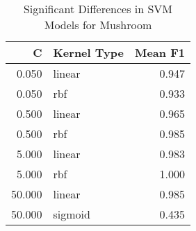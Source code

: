 \begin{table}[!htbp]
\centering
\caption{Significant Differences in SVM Models for Mushroom}
\label{tab:svm_significant_pairs_mushroom}
\begin{tabular}{rlr}
\toprule
C & Kernel Type & Mean F1 \\
\midrule
0.050 & linear & 0.947 \\
0.050 & rbf & 0.933 \\
0.500 & linear & 0.965 \\
0.500 & rbf & 0.985 \\
5.000 & linear & 0.983 \\
5.000 & rbf & 1.000 \\
50.000 & linear & 0.985 \\
50.000 & sigmoid & 0.435 \\
\bottomrule
\end{tabular}
\end{table}
